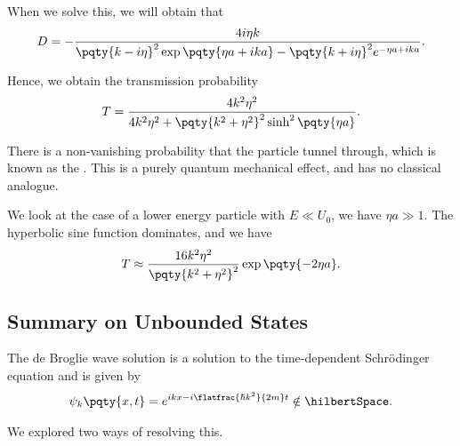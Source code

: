When we solve this, we will obtain that
\begin{equation}
    D = - \frac{4 i \eta k}{\pqty{k - i \eta}^2 \exp\pqty{\eta a + i k a} - \pqty{k + i \eta}^2 e^{- \eta a + i k a}}.
\end{equation}

Hence, we obtain the transmission probability
\begin{equation}
    T = \frac{4 k^2 \eta^2}{4 k^2 \eta^2 + \pqty{k^2 + \eta^2}^2 \sinh^2\pqty{\eta a}}.
\end{equation}

There is a non-vanishing probability that the particle tunnel through, which is known as the . This is a purely quantum mechanical effect, and has no classical analogue.

We look at the case of a lower energy particle with \(E \ll U_0\), we have \(\eta a \gg 1\). The hyperbolic sine function dominates, and we have
\begin{equation}
    T \approx \frac{16 k^2 \eta^2}{\pqty{k^2 + \eta^2}^2} \exp\pqty{- 2 \eta a}.
\end{equation}

\subsection*{Summary on Unbounded States}

The de Broglie wave solution is a solution to the time-dependent Schr\"{o}dinger equation and is given by
\begin{equation}
    \psi_k\pqty{x, t} = e^{i k x - i \flatfrac{\hbar k^2}{2 m} t} \notin \hilbertSpace.
\end{equation}

We explored two ways of resolving this.

